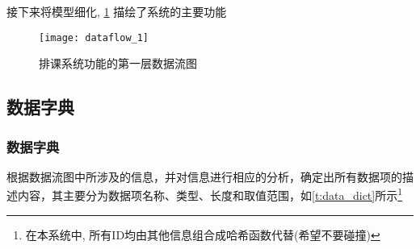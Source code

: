 \documentclass{myreport}
\begin{document}
    接下来将模型细化,
    \cref{fig:dataflow_1}
    描绘了系统的主要功能
    \begin{figure}[H]
      \centering
      \texttt{[image: dataflow\_1]}
      \caption{排课系统功能的第一层数据流图}
      \label{fig:dataflow_1}
    \end{figure}

  \subsection{数据字典}
    \subsubsection{数据字典}

      根据数据流图中所涉及的信息，并对信息进行相应的分析，确定出所有数据项的描述内容，其主要分为数据项名称、类型、长度和取值范围，如\cref{t:data_dict}所示\footnote{在本系统中, 所有ID均由其他信息组合成哈希函数代替(希望不要碰撞)}
\end{document}
